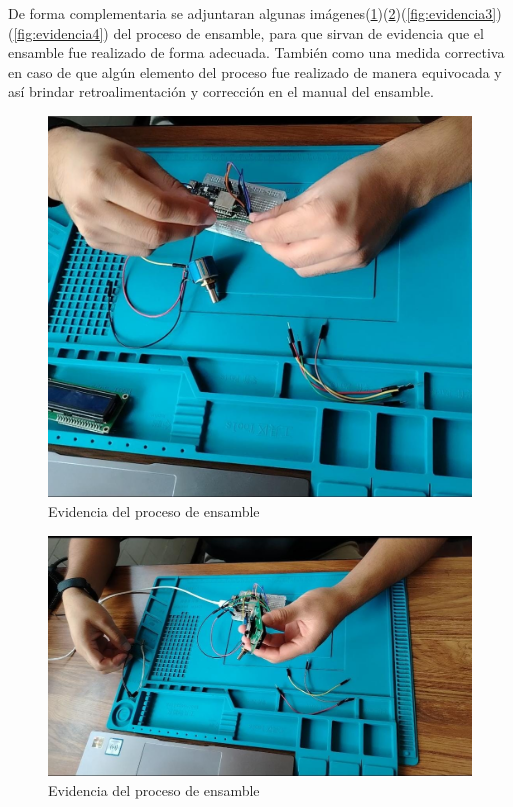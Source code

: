     De forma complementaria se adjuntaran algunas imágenes(\ref{fig:evidencia1})(\ref{fig:evidencia2})(\ref{fig:evidencia3})(\ref{fig:evidencia4}) del proceso de ensamble, para que sirvan de evidencia que el ensamble fue realizado de forma adecuada. También como una medida correctiva en caso de que algún elemento del proceso fue realizado de manera equivocada y así brindar retroalimentación y corrección en el manual del ensamble. 
    
    \begin{figure}[H]
            \centering
            \includegraphics[trim = {0mm 0mm 0mm 0mm},clip,scale=0.2]{12/Img/evidencia1.jpg}
            \caption{Evidencia del proceso de ensamble}
            \label{fig:evidencia1}
    \end{figure}
    
    \begin{figure}[H]
            \centering
            \includegraphics[trim = {0mm 0mm 0mm 0mm},clip,scale=0.2]{12/Img/evidencia2.jpg}
            \caption{Evidencia del proceso de ensamble}
            \label{fig:evidencia2}
    \end{figure}
    
